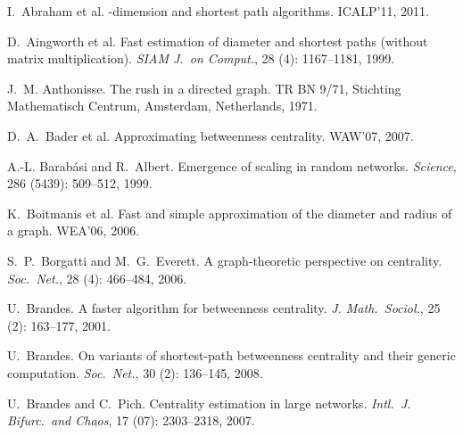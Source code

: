 \begin{thebibliography}{33}
I.~Abraham et al.
-dimension and shortest path algorithms.
\newblock ICALP'11, 2011.

D.~Aingworth et al.
\newblock Fast estimation of diameter and shortest paths (without matrix
  multiplication).
\newblock \emph{SIAM J.~on Comput.}, 28 (4): 1167--1181, 1999.

J.~M. Anthonisse.
\newblock The rush in a directed graph.
\newblock TR BN 9/71, Stichting Mathematisch Centrum, Amsterdam,
  Netherlands, 1971.

D.~A.~Bader et al.
\newblock Approximating betweenness centrality.
\newblock WAW'07, 2007.

A.-L. Barab{\'a}si and R.~Albert.
\newblock Emergence of scaling in random networks.
\newblock \emph{Science}, 286 (5439): 509--512, 1999.

K.~Boitmanis et al.
\newblock Fast and simple approximation of the diameter and radius of a graph.
\newblock WEA'06, 2006.

S.~P.~Borgatti and M.~G.~Everett.
\newblock A graph-theoretic perspective on centrality.
\newblock \emph{Soc.~Net.}, 28 (4): 466--484, 2006.

U.~Brandes.
\newblock A faster algorithm for betweenness centrality.
\newblock \emph{J. Math.~Sociol.}, 25 (2): 163--177, 2001.

U.~Brandes.
\newblock On variants of shortest-path betweenness centrality and their generic
  computation.
\newblock \emph{Soc.~Net.}, 30 (2): 136--145, 2008.

U.~Brandes and C.~Pich.
\newblock Centrality estimation in large networks.
\newblock \emph{Intl.~J. Bifurc.~and Chaos}, 17 (07):
2303--2318, 2007.


\end{thebibliography}
